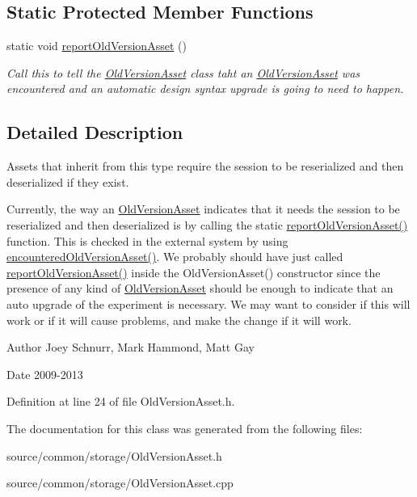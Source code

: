 \subsection*{Static Protected Member Functions}
\begin{DoxyCompactItemize}
\item 
\hypertarget{class_picto_1_1_old_version_asset_ae0813a051e7dd735a8ae1a86319e4535}{static void \hyperlink{class_picto_1_1_old_version_asset_ae0813a051e7dd735a8ae1a86319e4535}{report\-Old\-Version\-Asset} ()}\label{class_picto_1_1_old_version_asset_ae0813a051e7dd735a8ae1a86319e4535}

\begin{DoxyCompactList}\small\item\em Call this to tell the \hyperlink{class_picto_1_1_old_version_asset}{Old\-Version\-Asset} class taht an \hyperlink{class_picto_1_1_old_version_asset}{Old\-Version\-Asset} was encountered and an automatic design syntax upgrade is going to need to happen. \end{DoxyCompactList}\end{DoxyCompactItemize}


\subsection{Detailed Description}
Assets that inherit from this type require the session to be reserialized and then deserialized if they exist. 

Currently, the way an \hyperlink{class_picto_1_1_old_version_asset}{Old\-Version\-Asset} indicates that it needs the session to be reserialized and then deserialized is by calling the static \hyperlink{class_picto_1_1_old_version_asset_ae0813a051e7dd735a8ae1a86319e4535}{report\-Old\-Version\-Asset()} function. This is checked in the external system by using \hyperlink{class_picto_1_1_old_version_asset_a67f8d691fef4ea596c802a85f20df9f5}{encountered\-Old\-Version\-Asset()}. We probably should have just called \hyperlink{class_picto_1_1_old_version_asset_ae0813a051e7dd735a8ae1a86319e4535}{report\-Old\-Version\-Asset()} inside the Old\-Version\-Asset() constructor since the presence of any kind of \hyperlink{class_picto_1_1_old_version_asset}{Old\-Version\-Asset} should be enough to indicate that an auto upgrade of the experiment is necessary. We may want to consider if this will work or if it will cause problems, and make the change if it will work.

\begin{DoxyAuthor}{Author}
Joey Schnurr, Mark Hammond, Matt Gay 
\end{DoxyAuthor}
\begin{DoxyDate}{Date}
2009-\/2013 
\end{DoxyDate}


Definition at line 24 of file Old\-Version\-Asset.\-h.



The documentation for this class was generated from the following files\-:\begin{DoxyCompactItemize}
\item 
source/common/storage/Old\-Version\-Asset.\-h\item 
source/common/storage/Old\-Version\-Asset.\-cpp\end{DoxyCompactItemize}

